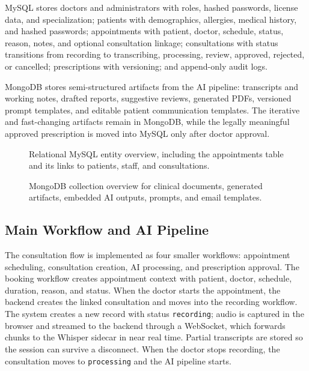 MySQL stores doctors and administrators with roles, hashed passwords, license data, and specialization; patients with demographics, allergies, medical history, and hashed passwords; appointments with patient, doctor, schedule, status, reason, notes, and optional consultation linkage; consultations with status transitions from recording to transcribing, processing, review, approved, rejected, or cancelled; prescriptions with versioning; and append-only audit logs.

MongoDB stores semi-structured artifacts from the AI pipeline: transcripts and working notes, drafted reports, suggestive reviews, generated PDFs, versioned prompt templates, and editable patient communication templates. The iterative and fast-changing artifacts remain in MongoDB, while the legally meaningful approved prescription is moved into MySQL only after doctor approval.

\begin{figure}[htbp]
\centering
{}
\caption{Relational MySQL entity overview, including the appointments table and its links to patients, staff, and consultations.}
\label{fig:mysql-er}
\end{figure}
\FloatBarrier

\begin{figure}[htbp]
\centering
{}
\caption{MongoDB collection overview for clinical documents, generated artifacts, embedded AI outputs, prompts, and email templates.}
\label{fig:mongodb-er}
\end{figure}
\FloatBarrier

\subsection{Main Workflow and AI Pipeline}
\label{subsec:main-workflow-ai-pipeline}

The consultation flow is implemented as four smaller workflows: appointment scheduling, consultation creation, AI processing, and prescription approval. The booking workflow creates appointment context with patient, doctor, schedule, duration, reason, and status. When the doctor starts the appointment, the backend creates the linked consultation and moves into the recording workflow. The system creates a new record with status \texttt{recording}; audio is captured in the browser and streamed to the backend through a WebSocket, which forwards chunks to the Whisper sidecar in near real time. Partial transcripts are stored so the session can survive a disconnect. When the doctor stops recording, the consultation moves to \texttt{processing} and the AI pipeline starts.

